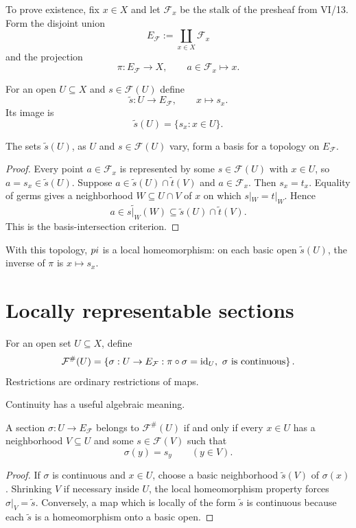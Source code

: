 To prove existence, fix $x\in X$ and let $\mathcal F_x$ be the stalk of the presheaf
from VI/13.  Form the disjoint union
\[
E_{\mathcal F}:=\coprod_{x\in X}\mathcal F_x
\]
and the projection
\[
\pi:E_{\mathcal F}\longrightarrow X,
\qquad a\in\mathcal F_x\longmapsto x.
\]

For an open $U\subseteq X$ and $s\in\mathcal F(U)$ define
\[
\widetilde s:U\longrightarrow E_{\mathcal F},
\qquad x\longmapsto s_x.
\]
Its image is
\[
\widetilde s(U)=\{s_x:x\in U\}.
\]



\begin{proposition}
The sets $\widetilde s(U)$, as $U$ and $s\in\mathcal F(U)$ vary, form a basis for a topology
on $E_{\mathcal F}$.
\end{proposition}
\begin{proof}
Every point $a\in\mathcal F_x$ is represented by some $s\in\mathcal F(U)$ with $x\in U$,
so $a=s_x\in\widetilde s(U)$.  Suppose
$a\in\widetilde s(U)\cap\widetilde t(V)$ and $a\in\mathcal F_x$.  Then $s_x=t_x$.
Equality of germs gives a neighborhood $W\subseteq U\cap V$ of $x$ on which
$s|_W=t|_W$.  Hence
\[
a\in\widetilde{s|_W}(W)\subseteq\widetilde s(U)\cap\widetilde t(V).
\]
This is the basis-intersection criterion.
\end{proof}

With this topology, $\\pi$ is a local homeomorphism: on each basic open
$\widetilde s(U)$, the inverse of $\pi$ is $x\mapsto s_x$.

\section{Locally representable sections}

\begin{definition}
For an open set $U\subseteq X$, define
\[
\mathcal F^\#(U)
=
\left\{\sigma:U\to E_{\mathcal F}:
\pi\circ\sigma=\operatorname{id}_U,
\ \sigma\text{ is continuous}\right\}.
\]
Restrictions are ordinary restrictions of maps.
\end{definition}

Continuity has a useful algebraic meaning.

\begin{proposition}
A section $\sigma:U\to E_{\mathcal F}$ belongs to $\mathcal F^\#(U)$ if and only if every
$x\in U$ has a neighborhood $V\subseteq U$ and some $s\in\mathcal F(V)$ such that
\[
\sigma(y)=s_y\qquad (y\in V).
\]
\end{proposition}
\begin{proof}
If $\sigma$ is continuous and $x\in U$, choose a basic neighborhood
$\widetilde s(V)$ of $\sigma(x)$.  Shrinking $V$ if necessary inside $U$, the local
homeomorphism property forces $\sigma|_V=\widetilde s$.  Conversely, a map which is locally
of the form $\widetilde s$ is continuous because each $\widetilde s$ is a homeomorphism
onto a basic open.
\end{proof}

